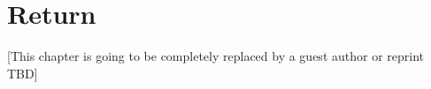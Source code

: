 \chapter{Return}
\label{sec:36}
[This chapter is going to be completely replaced by a guest author or reprint TBD]
%
%
%
